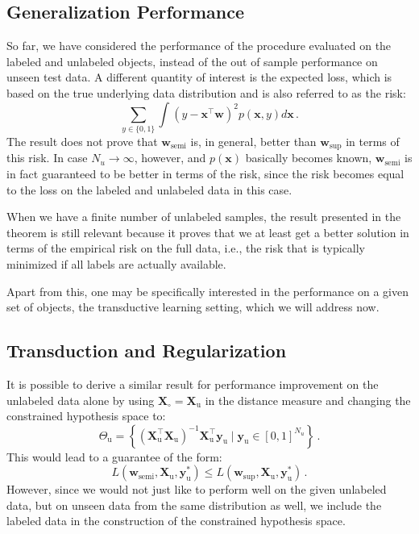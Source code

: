 \documentclass[smallcondensed]{svjour3}\usepackage[]{graphicx}\usepackage[]{color}
\renewcommand{\vec}[1]{\mathbf{#1}}
\begin{document}
\subsection{Generalization Performance}
So far, we have considered the performance of the procedure evaluated on the labeled and unlabeled objects, instead of the out of sample performance on unseen test data. A different quantity of interest is the expected loss, which is based on the true underlying data distribution and is also referred to as the risk:
\begin{equation} \label{eq:risk}
\sum_{y \in \{0,1\}} \int (y-\mathbf{x}^\top \mathbf{w})^2 p(\mathbf{x},y) d\mathbf{x} \,. \nonumber
\end{equation}
The result does not prove that $\mathbf{w}_\text{semi}$ is, in general, better than $\mathbf{w}_\text{sup}$ in terms of this risk. In case $N_u \to \infty$, however, and $p(\mathbf{x})$ basically becomes known, $\mathbf{w}_\mathrm{semi}$ is in fact guaranteed to be better in terms of the risk, since the risk becomes equal to the loss on the labeled and unlabeled data in this case.

When we have a finite number of unlabeled samples, the result presented in the theorem is still relevant because it proves that we at least get a better solution in terms of the empirical risk on the full data, i.e., the risk that is typically minimized if all labels are actually available.

Apart from this, one may be specifically interested in the performance on a given set of objects, the transductive learning setting, which we will address now.

\subsection{Transduction and Regularization}
It is possible to derive a similar result for performance improvement on the unlabeled data alone by using $\vec{X}_\circ=\vec{X}_\text{u}$ in the distance measure and changing the constrained hypothesis space to:
\begin{equation}
\label{eq:constrainedregion2}
\Theta_\text{u} = \left\{ (\vec{X}_\mathrm{u}^\top \vec{X}_\mathrm{u})^{-1} \vec{X}_\mathrm{u}^\top \vec{y}_\mathrm{u} \mid \vec{y}_\text{u} \in [0,1]^{N_u} \right\}  \, . \nonumber
\end{equation}
This would lead to a guarantee of the form:
\begin{equation}
L(\vec{w}_\mathrm{semi},\vec{X}_\mathrm{u},\vec{y}_\mathrm{u}^{\ast}) \leq L(\vec{w}_\mathrm{sup},\vec{X}_\mathrm{u},\vec{y}_\mathrm{u}^{\ast})  \, . \nonumber
\end{equation}
However, since we would not just like to perform well on the given unlabeled data, but on unseen data from the same distribution as well, we include the labeled data in the construction of the constrained hypothesis space.
\end{document}
